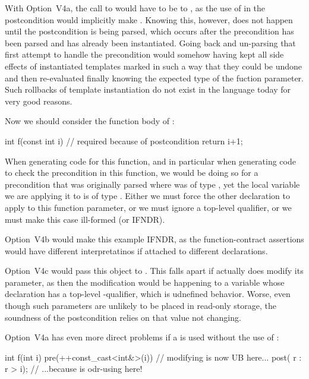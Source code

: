 With Option~V4a, the call to  would have to be to , as the use of  in the postcondition would implicitly make  .   Knowing this, however, does not happen until the postcondition is being parsed, which occurs after the precondition has been parsed and  has already been instantiated.   Going back and un-parsing that first attempt to handle the precondition would somehow having kept all side effects of instantiated templates marked in such a way that they could be undone and then re-evaluated finally knowing the expected type of the fuction parameter.   Such rollbacks of template instantiation do not exist in the language today for very good reasons.

Now we should consider the function body of :
\begin{codeblock}
int f(const int i)  //  required because of postcondition
{
  return i+1;
}
\end{codeblock}
When generating code for this function, and in particular when generating code to check the precondition in this function, we would be doing so for a precondition that was originally parsed where  was of type , yet the local variable we are applying it to is of type .   Either we must force the other declaration to apply to this function parameter, or we must ignore a top-level  qualifier, or we must make this case ill-formed (or IFNDR).

Option~V4b would make this example IFNDR, as the function-contract assertions would have different interpretatinos if attached to different declarations.

Option~V4c would pass this  object to .  This falls apart if  actually does modify its parameter, as then the modification would be happening to a variable whose declaration has a top-level -qualifier, which is udnefined behavior.  Worse, even though such parameters are unlikely to be placed in read-only storage, the soundness of the postcondition relies on that value not changing.

Option~V4a has even more direct problems if a  is used without the use of :
\begin{codeblock}
int f(int i) 
  pre(++const_cast<int&>(i))  // modifying  is now UB here...
  post( r : r > i);  // ...because  is odr-using  here!
\end{codeblock}

